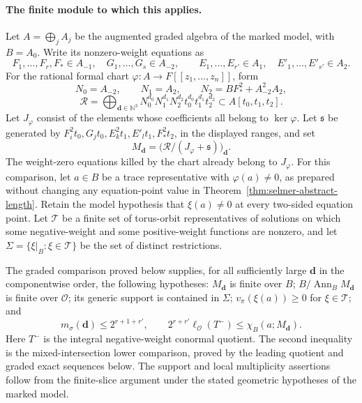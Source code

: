 \paragraph{The finite module to which this applies.}
Let $A=\bigoplus_j A_j$ be the augmented graded algebra of the marked model,
with $B=A_0$. Write its nonzero-weight equations as
\[
 F_1,\ldots,F_r,F_*\in A_{-1},\quad G_1,\ldots,G_s\in A_{-2},
 \qquad E_1,\ldots,E_{r'}\in A_1,\quad E'_1,\ldots,E'_{s'}\in A_2.
\]
For the rational formal chart $\varphi:A\to F[[z_1,\ldots,z_n]]$, form
\[
 N_0=A_{-2},\qquad N_1=A_2,\qquad N_2=BF_*^2+A_{-2}^2A_2,
\]
\[
 \mathcal R=\bigoplus_{\boldsymbol d\in\mathbb N^3}
 N_0^{d_0}N_1^{d_1}N_2^{d_2}
 t_0^{d_0}t_1^{d_1}t_2^{d_2}\subset A[t_0,t_1,t_2].
\]
Let $J_\varphi$ consist of the elements whose coefficients all belong to
$\ker\varphi$. Let $\mathfrak s$ be generated by
$F_i^2t_0,G_jt_0,E_k^2t_1,E'_lt_1,F_*^2t_2$, in the displayed ranges, and set
\[
 M_{\boldsymbol d}
 =\bigl(\mathcal R/(J_\varphi+\mathfrak s)\bigr)_{\boldsymbol d}.
\]
The weight-zero equations killed by the chart already belong to
$J_\varphi$. For this comparison, let $a\in B$ be a trace representative
with $\varphi(a)\ne0$, as prepared without changing any equation-point
value in Theorem~\ref{thm:selmer-abstract-length}. Retain the model
hypothesis that $\xi(a)\ne0$ at every two-sided equation point.
Let $\mathcal T$ be a
finite set of torus-orbit representatives of solutions on which some
negative-weight and some positive-weight functions are nonzero, and let
$\Sigma=\{\xi|_B:\xi\in\mathcal T\}$ be the set of distinct restrictions.

The graded comparison proved below supplies, for all sufficiently large
$\boldsymbol d$ in the componentwise order, the following hypotheses:
$M_{\boldsymbol d}$ is finite over $B$;
$B/\operatorname{Ann}_B M_{\boldsymbol d}$ is finite over $\mathcal O$;
its generic support is contained in $\Sigma$;
$v_\pi(\xi(a))\ge0$ for $\xi\in\mathcal T$; and
\begin{equation}
 m_\sigma(\boldsymbol d)\le2^{r+1+r'},
 \qquad
 2^{r+r'}\ell_{\mathcal O}(T^-)
 \le\chi_B(a;M_{\boldsymbol d}).
 \label{eq:selmer-euler-retained-inputs}
\end{equation}
Here $T^-$ is the integral negative-weight conormal quotient. The second
inequality is the mixed-intersection lower comparison, proved by the
leading quotient and graded exact sequences below. The support and local
multiplicity assertions follow from the finite-slice argument under the
stated geometric hypotheses of the marked model.

